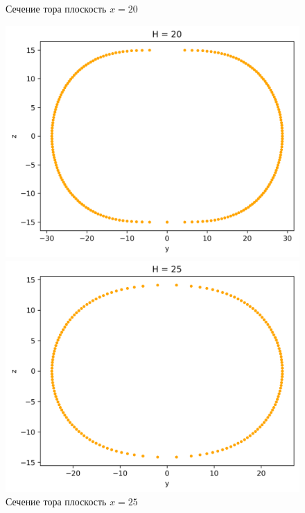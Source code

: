\documentclass[a4]{article}
\begin{document}
\begin{figure}[H]
\caption{Сечение тора плоскость $x=20$ }
\includegraphics[scale=0.9]{TS20.png} 

\caption{Сечение тора плоскость $x=25$ }
\includegraphics[scale=0.9]{TS25.png} 
\end{figure}
\end{document}
